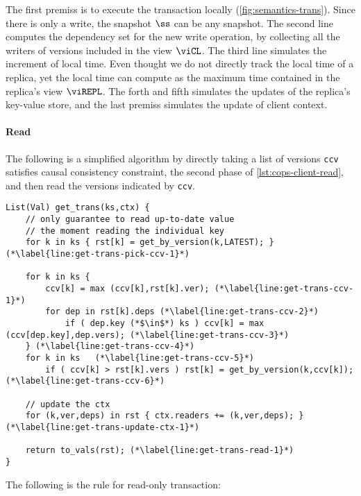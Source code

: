 The first premiss is to execute the transaction locally (\cref{fig:semantics-trans}).
Since there is only a write, the snapshot \( \ss \) can be any snapshot.
The second line computes the dependency set for the new write operation,
by collecting all the writers of versions included in the view \( \viCL \).
The third line simulates the increment of local time.
Even thought we do not directly track the local time of a replica, 
yet the local time can compute as the maximum time contained in the replica's view \( \viREPL \).
The forth and fifth simulates the updates of the replica's key-value store,
and the last premiss simulates the update of client context.

\paragraph{\bf Read}
The following is a simplified algorithm by directly taking a list of versions 
\verb|ccv| satisfies causal consistency constraint,
\ie the second phase of \cref{lst:cops-client-read},
and then read the versions indicated by \verb|ccv|.

\begin{lstlisting}[caption={get\_trans},label={lst:get-trans}]
List(Val) get_trans(ks,ctx) {
    // only guarantee to read up-to-date value 
    // the moment reading the individual key
    for k in ks { rst[k] = get_by_version(k,LATEST); } (*\label{line:get-trans-pick-ccv-1}*)

    for k in ks { 
        ccv[k] = max (ccv[k],rst[k].ver); (*\label{line:get-trans-ccv-1}*)
        for dep in rst[k].deps (*\label{line:get-trans-ccv-2}*)
            if ( dep.key (*$\in$*) ks ) ccv[k] = max (ccv[dep.key],dep.vers); (*\label{line:get-trans-ccv-3}*) 
    } (*\label{line:get-trans-ccv-4}*)
    for k in ks   (*\label{line:get-trans-ccv-5}*)
        if ( ccv[k] > rst[k].vers ) rst[k] = get_by_version(k,ccv[k]); (*\label{line:get-trans-ccv-6}*)

    // update the ctx
    for (k,ver,deps) in rst { ctx.readers += (k,ver,deps); } (*\label{line:get-trans-update-ctx-1}*)

    return to_vals(rst); (*\label{line:get-trans-read-1}*)
}                                   
\end{lstlisting}

The following is the rule for read-only transaction:

